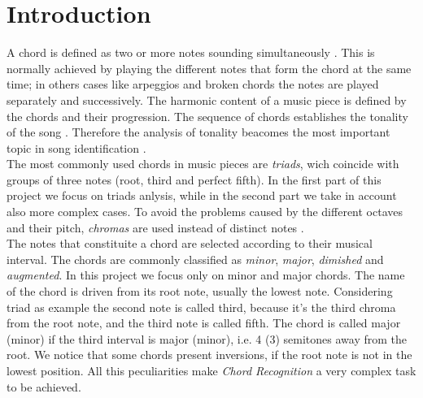 \section{Introduction}
\label{sec:intro}

A chord is defined as two or more notes sounding simultaneously \cite{benward2014music}. This is normally achieved by playing the different notes that form the chord at the same time; in others cases like arpeggios and broken chords the notes are played separately and successively. The harmonic content of a music piece is defined by the chords and their progression. The sequence of chords establishes the tonality of the song \cite{papadopoulos2007large}. Therefore the analysis of tonality beacomes the most important topic in song identification \cite{lee2006identifying}. \\
%
The most commonly used chords in music pieces are \textit{triads}, wich coincide with groups of three notes (root, third and perfect fifth). In the first part of this project we focus on triads anlysis, while in the second part we take in account also more complex cases. To avoid the problems caused by the different octaves and their pitch, \textit{chromas} are used instead of distinct notes \cite{bartsch2005audio}.\\
%
The notes that constituite a chord are selected according to their musical interval. The chords are commonly classified as \textit{minor}, \textit{major}, \textit{dimished} and \textit{augmented}. In this project we focus only on minor and major chords. The name of the chord is driven from its root note, usually the lowest note. Considering triad as example the second note is called third, because it's the third chroma from the root note, and the third note is called fifth. The chord is called major (minor) if the third interval is major (minor), i.e. 4 (3) semitones away from the root. We notice that some chords present inversions, if the root note is not in the lowest position. All this peculiarities make \textit{Chord Recognition} a very complex task to be achieved.
